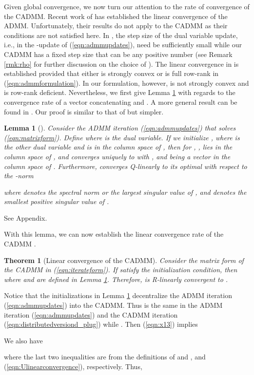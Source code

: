 \documentclass[journal]{IEEEtran}
\newtheorem{theorem}{Theorem}
\newtheorem{lemma}{Lemma}
\begin{document}
Given global convergence, we now turn our attention to the rate of convergence of the CADMM. Recent work of \cite{Hong2012, Deng2016}
has established the linear convergence of the ADMM. Unfortunately, their results do not apply to the CADMM as their conditions are not satisfied here. In \cite{Hong2012}, the step size of the dual variable update, i.e.,  in the -update of (\ref{eqn:admmupdates}), need be sufficiently small while our CADMM has a fixed step size  that can be any positive number (see Remark \ref{rmk:rho} for further discussion on the choice of ). The linear convergence in \cite{Deng2016} is established provided that either  is strongly convex or  is full row-rank in (\ref{eqn:admmformulation}). In our formulation, however,  is not strongly convex and  is row-rank deficient. Nevertheless, we first give Lemma \ref{lem:linearconvergence} with regards to the convergence rate of a vector concatenating  and . A more general result can be found in \cite[Theorem 1]{Shi2014}. Our proof is similar to that of \cite{Shi2014} but simpler.

\begin{lemma}[{\cite[Theorem 1]{Shi2014}}]
\label{lem:linearconvergence} 
Consider the ADMM iteration (\ref{eqn:admmupdates}) that solves (\ref{eqn:matrixform}). Define where  is the dual variable. If we initialize ,  where  is the other dual variable and  is in the column space of , then for , ,  lies in the column space of , and  converges uniquely to  with ,  and  being a vector in the column space of . Furthermore,  converges Q-linearly to its optimal  with respect to the -norm

where 
 denotes the spectral norm or the largest singular value of , and  denotes the smallest positive singular value of .
\end{lemma}
\begin{IEEEproof}
See Appendix.
\end{IEEEproof}

With this lemma, we can now establish the linear convergence rate of the CADMM .

\begin{theorem}[Linear convergence of the CADMM]
\label{thm:linearconandbound}
Consider the matrix form of the CADMM in (\ref{eqn:iterateform}). If  satisfy the initialization condition, then 
 where  and  are defined in Lemma \ref{lem:linearconvergence}. Therefore,  is R-linearly convergent to .
\end{theorem}
\begin{IEEEproof}
Notice that the initializations in Lemma \ref{lem:linearconvergence} decentralize the ADMM iteration (\ref{eqn:admmupdates}) into the CADMM. Thus  is the same in the ADMM iteration (\ref{eqn:admmupdates}) and the CADMM iteration (\ref{eqn:distributedversiond_plug}) while . Then (\ref{eqn:x13}) implies 
 
We also have  

where the last two inequalities are from the definitions of  and , and (\ref{eqn:Ulinearconvergence}), respectively.
Thus, 

\end{IEEEproof}
\end{document}
